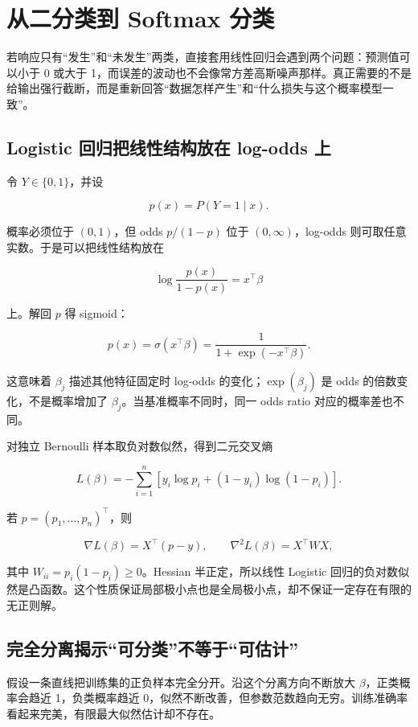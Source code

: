 \section{从二分类到 Softmax 分类}

若响应只有``发生''和``未发生''两类，直接套用线性回归会遇到两个问题：预测值可以小于 0 或大于 1，而误差的波动也不会像常方差高斯噪声那样。真正需要的不是给输出强行截断，而是重新回答``数据怎样产生''和``什么损失与这个概率模型一致''。

\subsection{Logistic 回归把线性结构放在 log-odds 上}

令 \(Y\in\{0,1\}\)，并设

\[
p(x)=P(Y=1\mid x).
\]

概率必须位于 \((0,1)\)，但 odds \(p/(1-p)\) 位于 \((0,\infty)\)，log-odds 则可取任意实数。于是可以把线性结构放在

\[
\log\frac{p(x)}{1-p(x)}=x^\top\beta
\]

上。解回 \(p\) 得 sigmoid：

\[
p(x)=\sigma(x^\top\beta)
=\frac{1}{1+\exp(-x^\top\beta)}.
\]

这意味着 \(\beta_j\) 描述其他特征固定时 log-odds 的变化；\(\exp(\beta_j)\) 是 odds 的倍数变化，不是概率增加了 \(\beta_j\)。当基准概率不同时，同一 odds ratio 对应的概率差也不同。

对独立 Bernoulli 样本取负对数似然，得到二元交叉熵

\[
L(\beta)
=-\sum_{i=1}^n
\left[
y_i\log p_i+(1-y_i)\log(1-p_i)
\right].
\]

若 \(p=(p_1,\ldots,p_n)^\top\)，则

\[
\nabla L(\beta)=X^\top(p-y),\qquad
\nabla^2L(\beta)=X^\top WX,
\]

其中 \(W_{ii}=p_i(1-p_i)\ge0\)。Hessian 半正定，所以线性 Logistic 回归的负对数似然是凸函数。这个性质保证局部极小点也是全局极小点，却不保证一定存在有限的无正则解。

\subsection{完全分离揭示``可分类''不等于``可估计''}

假设一条直线把训练集的正负样本完全分开。沿这个分离方向不断放大 \(\beta\)，正类概率会趋近 1，负类概率趋近 0，似然不断改善，但参数范数趋向无穷。训练准确率看起来完美，有限最大似然估计却不存在。

